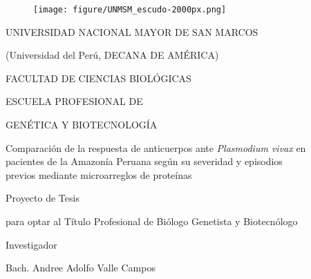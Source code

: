 \documentclass[a4paper]{article}
\title{}
\author{}
\date{}
\begin{document}
\renewcommand{\contentsname}{Índice General} 
\renewcommand{\tablename}{Tabla}
\renewcommand{\tableautorefname}{Tabla}


\clearpage
{}

\begin{centering}

\begin{figure}[!ht]
  \begin{center}
    \texttt{[image: figure/UNMSM\_escudo-2000px.png]}%
  \end{center}
\end{figure}

\Large %
UNIVERSIDAD NACIONAL MAYOR DE SAN MARCOS

\large
(Universidad del Perú, DECANA DE AMÉRICA)

\vspace{.3 cm}

\Large
FACULTAD DE CIENCIAS BIOLÓGICAS

\vspace{.3 cm}

\normalsize
ESCUELA PROFESIONAL DE

GENÉTICA Y BIOTECNOLOGÍA

\vspace{3 cm}

\Large
Comparación de la respuesta de anticuerpos ante %
\textit{Plasmodium vivax}
en \\pacientes de la Amazonía Peruana %
según su severidad y episodios \\previos %
mediante microarreglos de proteínas

\vspace{3 cm}

\large
Proyecto de Tesis 

para optar al Título Profesional de Biólogo Genetista y Biotecnólogo

\vspace{.3 cm}

\large
Investigador

Bach. Andree Adolfo Valle Campos


\end{centering}
\end{document}
